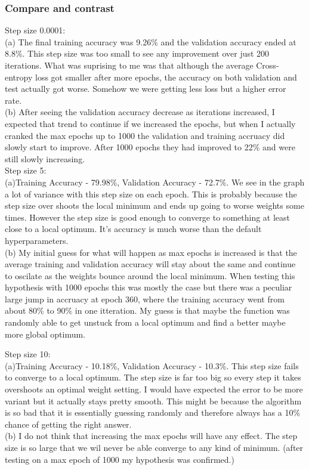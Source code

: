 \documentclass{article}
\begin{document}
\subsubsection*{Compare and contrast}

Step size 0.0001: \\[1em]
(a) The final training accuracy was 9.26\% and the validation accuracy ended at 8.8\%. This step size was too small to see any improvement over just 200 iterations. What was suprising to me was that although the average Cross-entropy loss got smaller after more epochs, the accuracy on both validation and test actually got worse. Somehow we were getting less loss but a higher error rate. \\[1em]
(b) After seeing the validation accuracy decrease as iterations increased, I expected that trend to continue if we increased the epochs, but when I actually cranked the max epochs up to 1000 the validation and training accruacy did slowly start to improve. After 1000 epochs they had improved to 22\% and were still slowly increasing. \\[1em]
Step size 5: \\[1em]
(a)Training Accuracy - 79.98\%, Validation Accuracy - 72.7\%. We see in the graph a lot of variance with this step size on each epoch. This is probably because the step size over shoots the local minimum and ends up going to worse weights some times. However the step size is good enough to converge to something at least close to a local optimum. It's accuracy is much worse than the default hyperparameters.\\[1em]
(b) My initial guess for what will happen as max epochs is increased is that the average training and validation accuracy will stay about the same and continue to oscilate as the weights bounce around the local minimum. When testing this hypothesis with 1000 epochs this was mostly the case but there was a peculiar large jump in accruacy at epoch 360, where the training accuracy went from about 80\% to 90\% in one itteration. My guess is that maybe the function was randomly able to get unstuck from a local optimum and find a better maybe more global optimum.\\[1em]
\pagebreak

\noindent Step size 10: \\[1em]
(a)Training Accuracy - 10.18\%, Validation Accuracy - 10.3\%. This step size fails to converge to a local optimum. The step size is far too big so every step it takes overshoots an optimal weight setting. I would have expected the error to be more variant but it actually stays pretty smooth. This might be because the algorithm is so bad that it is essentially guessing randomly and therefore always has a 10\% chance of getting the right answer.\\[1em]
(b) I do not think that increasing the max epochs will have any effect. The step size is so large that we wil never be able converge to any kind of minimum. (after testing on a max epoch of 1000 my hypothesis was confirmed.)
\end{document}
